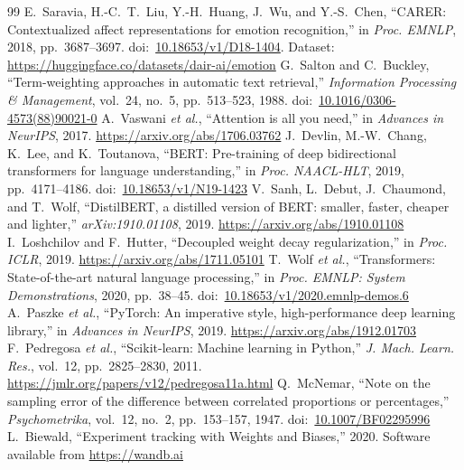 \documentclass[11pt,a4paper]{article}
\begin{document}
\begin{thebibliography}{99}
 E.~Saravia, H.-C.~T.~Liu, Y.-H.~Huang, J.~Wu, and Y.-S.~Chen, ``CARER: Contextualized affect representations for emotion recognition,'' in \emph{Proc. EMNLP}, 2018, pp.~3687--3697. doi:~\href{https://doi.org/10.18653/v1/D18-1404}{10.18653/v1/D18-1404}. Dataset: \url{https://huggingface.co/datasets/dair-ai/emotion}
 G.~Salton and C.~Buckley, ``Term-weighting approaches in automatic text retrieval,'' \emph{Information Processing \& Management}, vol.~24, no.~5, pp.~513--523, 1988. doi:~\href{https://doi.org/10.1016/0306-4573(88)90021-0}{10.1016/0306-4573(88)90021-0}
 A.~Vaswani \emph{et al.}, ``Attention is all you need,'' in \emph{Advances in NeurIPS}, 2017. \url{https://arxiv.org/abs/1706.03762}
 J.~Devlin, M.-W.~Chang, K.~Lee, and K.~Toutanova, ``BERT: Pre-training of deep bidirectional transformers for language understanding,'' in \emph{Proc. NAACL-HLT}, 2019, pp.~4171--4186. doi:~\href{https://doi.org/10.18653/v1/N19-1423}{10.18653/v1/N19-1423}
 V.~Sanh, L.~Debut, J.~Chaumond, and T.~Wolf, ``DistilBERT, a distilled version of BERT: smaller, faster, cheaper and lighter,'' \emph{arXiv:1910.01108}, 2019. \url{https://arxiv.org/abs/1910.01108}
 I.~Loshchilov and F.~Hutter, ``Decoupled weight decay regularization,'' in \emph{Proc. ICLR}, 2019. \url{https://arxiv.org/abs/1711.05101}
 T.~Wolf \emph{et al.}, ``Transformers: State-of-the-art natural language processing,'' in \emph{Proc. EMNLP: System Demonstrations}, 2020, pp.~38--45. doi:~\href{https://doi.org/10.18653/v1/2020.emnlp-demos.6}{10.18653/v1/2020.emnlp-demos.6}
 A.~Paszke \emph{et al.}, ``PyTorch: An imperative style, high-performance deep learning library,'' in \emph{Advances in NeurIPS}, 2019. \url{https://arxiv.org/abs/1912.01703}
 F.~Pedregosa \emph{et al.}, ``Scikit-learn: Machine learning in Python,'' \emph{J. Mach. Learn. Res.}, vol.~12, pp.~2825--2830, 2011. \url{https://jmlr.org/papers/v12/pedregosa11a.html}
 Q.~McNemar, ``Note on the sampling error of the difference between correlated proportions or percentages,'' \emph{Psychometrika}, vol.~12, no.~2, pp.~153--157, 1947. doi:~\href{https://doi.org/10.1007/BF02295996}{10.1007/BF02295996}
 L.~Biewald, ``Experiment tracking with Weights and Biases,'' 2020. Software available from \url{https://wandb.ai}
\end{thebibliography}
\end{document}
